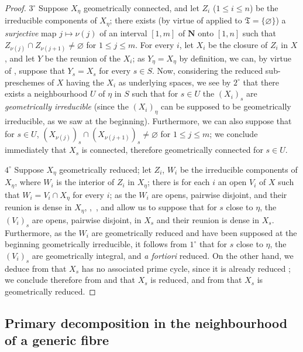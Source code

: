 \begin{proof}
$3^\circ$ Suppose $X_\eta$ geometrically connected, and let $Z_i$ ($1\leqslant i\leqslant n$) be the irreducible components of $X_\eta$; there exists (by virtue of  applied to $\mathfrak{T}=\{\varnothing\}$) a \emph{surjective} map $j\mapsto\nu(j)$ of an interval $[1,m]$ of $\mathbf{N}$ onto $[1,n]$ such that $Z_{\nu(j)}\cap Z_{\nu(j+1)}\neq\varnothing$ for $1\leqslant j\leqslant m$.
For every $i$, let $X_i$ be the closure of $Z_i$ in $X$, and let $Y$ be the reunion of the $X_i$; as $Y_\eta=X_\eta$ by definition, we can, by virtue of , suppose that $Y_s=X_s$ for every $s\in S$.
Now, considering the reduced sub-preschemes of $X$ having the $X_i$ as underlying spaces, we see by $2^\circ$ that there exists a neighbourhood $U$ of $\eta$ in $S$ such that for $s\in U$ the $(X_i)_s$ are \emph{geometrically irreducible} (since the $(X_i)_\eta$ can be supposed to be geometrically irreducible, as we saw at the beginning).
Furthermore, we can also suppose that for $s\in U$, $(X_{\nu(j)})_s\cap(X_{\nu(j+1)})_s\neq\varnothing$  for $1\leqslant j\leqslant m$; we conclude immediately that $X_s$ is connected, therefore  geometrically connected for $s\in U$.

$4^\circ$ Suppose $X_\eta$ geometrically reduced; let $Z_i$, $W_i$ be the irreducible components of $X_\eta$, where $W_i$ is the interior of $Z_i$ in $X_\eta$; there is for each $i$ an open $V_i$ of $X$ such that $W_i=V_i\cap X_\eta$ for every $i$; as the $W_i$ are opens, pairwise disjoint, and their reunion is dense in $X_\eta$, ,~, and  allow us to suppose that for $s$ close to $\eta$, the $(V_i)_s$ are opens, pairwise disjoint, in $X_s$ and their reunion is dense in $X_s$.
Furthermore, as the $W_i$ are geometrically reduced and have been supposed at the beginning geometrically irreducible, it follows from $1^\circ$ that for $s$ close to $\eta$, the $(V_i)_s$ are geometrically integral, and \emph{a fortiori} reduced.
On the other hand, we deduce from  that $X_s$ has no associated prime cycle, since it is already reduced ; we conclude therefore from  and  that $X_s$ is reduced, and from  that $X_s$ is geometrically reduced.
\end{proof}
\subsection{Primary decomposition in the neighbourhood of a generic fibre}
\label{subsection:IV.9.8}

